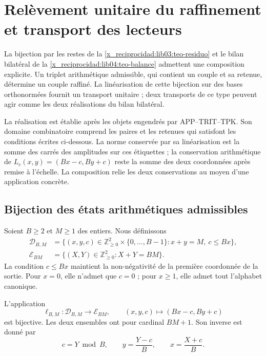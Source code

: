 \chapter{Relèvement unitaire du raffinement et transport des lecteurs}
\label{x_reciprocidad:lib05:levantamiento}

La bijection par les restes de la \cref{x_reciprocidad:lib03:teo-residuo} et le
bilan bilatéral de la \cref{x_reciprocidad:lib04:teo-balance} admettent une
composition explicite. Un triplet arithmétique admissible, qui contient
un couple et sa retenue, détermine un couple raffiné. La
linéarisation de cette bijection sur des bases orthonormées fournit
un transport unitaire ; deux transports de ce type peuvent agir
comme les deux réalisations du bilan bilatéral.

La réalisation est établie après les objets engendrés par APP--TRIT--TPK. Son domaine combinatoire comprend les paires et les retenues qui satisfont les conditions écrites ci-dessous. La norme conservée par sa linéarisation est la somme des carrés des amplitudes sur ces étiquettes ; la conservation arithmétique de \(L_c(x,y)=(Bx-c,By+c)\) reste la somme des deux coordonnées après remise à l'échelle. La composition relie les deux conservations au moyen d'une application concrète.

\section{Bijection des états arithmétiques admissibles}
\label{x_reciprocidad:lib05:biyeccion}

Soient \(B\geq2\) et \(M\geq1\) des entiers. Nous définissons
\begin{align}
 \mathcal D_{B,M}
 &=\bigl\{(x,y,c)\in\mathbb Z_{\geq0}^2
                 \times\{0,\ldots,B-1\}:x+y=M,\ c\leq Bx\bigr\},
 \label{x_reciprocidad:lib05:dominio}\\
 \mathcal E_{BM}
 &=\bigl\{(X,Y)\in\mathbb Z_{\geq0}^2:X+Y=BM\bigr\}.
 \label{x_reciprocidad:lib05:codominio}
\end{align}
La condition \(c\leq Bx\) maintient la non-négativité de la
première coordonnée de la sortie. Pour \(x=0\), elle n’admet que
\(c=0\) ; pour \(x\geq1\), elle admet tout l’alphabet canonique.

\begin{theorem}
\label{x_reciprocidad:lib05:teo-biyeccion}
L'application
\begin{equation}
 \ell_{B,M}:\mathcal D_{B,M}\longrightarrow\mathcal E_{BM},
 \qquad (x,y,c)\longmapsto(Bx-c,By+c)
 \label{x_reciprocidad:lib05:mapa-etiquetas}
\end{equation}
est bijective. Les deux ensembles ont pour cardinal \(BM+1\). Son inverse
est donné par
\begin{equation}
 c=Y\bmod B,\qquad y=\frac{Y-c}{B},\qquad x=\frac{X+c}{B}.
 \label{x_reciprocidad:lib05:inversa-etiquetas}
\end{equation}
\end{theorem}

